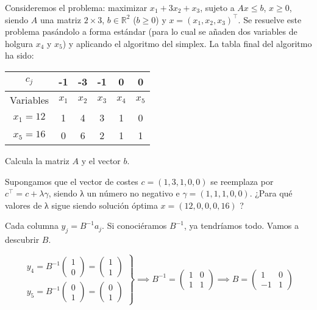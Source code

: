 \begin{problem}[6]

Consideremos el problema:
maximizar $x_1+3x_2+x_3$, sujeto a $Ax\leq b$, $x\geq 0$,
siendo $A$ una matriz $2\times 3$, $b\in\mathbb{R}^2$ ($b\geq 0$) y
$x=(x_1,x_2,x_3)^\top$.
Se resuelve este problema pas\'andolo a forma est\'andar
(para lo cual se a\~naden dos variables de holgura $x_4$ y $x_5$) y
aplicando el algoritmo del simplex. La tabla final del algoritmo ha
sido:

\begin{center}
\begin{tabular}{c||c|c|c|c|c}
$c_j$&-1&-3&-1&0&0\\
\hline
Variables&$x_1$&$x_2$&$x_3$&$x_4$&$x_5$\\
\hline
$x_1=12$&1&4&3&1&0\\
$x_5=16$&0&6&2&1&1\\
\end{tabular}
\end{center}

\ppart Calcula la matriz $A$ y el vector $b$.

\ppart Supongamos que el vector de costes $c = (1, 3, 1, 0, 0)$ se reemplaza por $c^\top = c + λγ$, siendo λ un número no negativo e $γ = (1, 1, 1, 0, 0)$. ¿Para qué valores de λ sigue siendo solución óptima $x = (12, 0, 0, 0, 16)$ ?

\solution

\spart

Cada columna $y_j = B^{-1}a_j$.
%
Si conociéramos $B^{-1}$, ya tendríamos todo.
%
Vamos a descubrir $B$.

\[
	\left.\begin{array}{c}
		y_4 = B^{-1}\begin{pmatrix}1\\0\end{pmatrix} = \begin{pmatrix}1\\1\end{pmatrix}\\
		y_5 = B^{-1}\begin{pmatrix}0\\1\end{pmatrix} = \begin{pmatrix}0\\1\end{pmatrix}
	\end{array}\right\} \implies B^{-1} = \begin{pmatrix}1&0\\1&1\end{pmatrix} \implies B = \begin{pmatrix}1&0\\-1&1\end{pmatrix}
\]


\end{problem}
